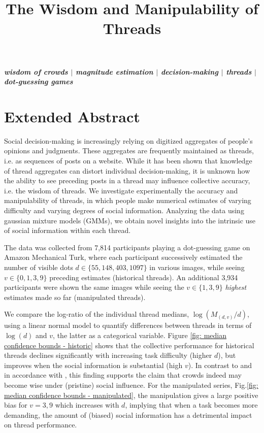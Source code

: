 \documentclass[a4paper,12pt]{article}
\title{The Wisdom and Manipulability of Threads}
\author[]{} %
\date{}
\begin{document}
\maketitle
\thispagestyle{fancy}

\vspace{-7em}
\begin{center}
\textbf{\textit{wisdom of crowds $|$ magnitude estimation $|$ decision-making $|$ threads $|$  dot-guessing games}}
\newline
\end{center}

\section*{Extended Abstract}
Social decision-making is increasingly relying on digitized aggregates of people’s opinions and judgments. These aggregates are frequently maintained as threads, i.e. as sequences of posts on a website. While it has been shown that knowledge of thread aggregates can distort individual decision-making, it is unknown how the ability to see preceding posts in a thread may influence collective accuracy, i.e. the wisdom of threads. We investigate experimentally the accuracy and manipulability of threads, in which people make numerical estimates of varying difficulty and varying degrees of social information. Analyzing the data using gaussian mixture models (GMMs), we obtain novel insights into the intrinsic use of social information within
each thread.

The data was collected from 7,814 participants playing a dot-guessing game \cite{horton2010dot} on Amazon Mechanical Turk, where each participant successively estimated the number of visible dots $d \in \{55,148,403,1097\}$ in various images, while seeing $v \in \{0,1,3,9\}$ preceding estimates (historical threads). An additional 3,934 participants were shown the same images while seeing the $v \in \{1,3,9\}$ \textit{highest} estimates made so far (manipulated threads). 

We compare the log-ratio of the individual thread medians, $\log(M_{(d,v)}/d)$, using a linear normal model to quantify differences between threads in terms of $\log(d)$ and $v$, the latter as a categorical variable. Figure \ref{fig: median confidence bounds - historic} shows that the collective performance for historical threads declines significantly with increasing task difficulty (higher $d$), but improves when the social information is substantial (high $v$). In contrast to \cite{lorenz2011social} and in accordance with \cite{becker2017network}, this finding supports the claim that crowds indeed may become wise under (pristine) social influence. For the manipulated series, Fig.\ref{fig: median confidence bounds - manipulated}, the manipulation gives a large positive bias for $v=3,9$ which increases with $d$, implying that when a task becomes more demanding, the amount of (biased) social information has a detrimental impact on thread performance.
\end{document}
